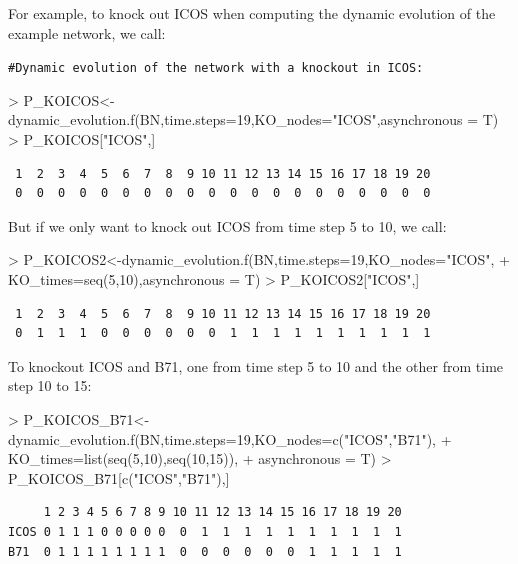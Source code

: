 \documentclass[a4paper]{article}
\begin{document}
For example, to knock out ICOS when computing the dynamic evolution of the example network, we call:
\begin{Schunk}
\end{Schunk}
\texttt{\#Dynamic evolution of the network with a knockout in ICOS:}
\begin{Schunk}
\begin{Sinput}
> P_KOICOS<-dynamic_evolution.f(BN,time.steps=19,KO_nodes="ICOS",asynchronous = T)
> P_KOICOS["ICOS",]
\end{Sinput}
\end{Schunk}
\begin{verbatim}
 1  2  3  4  5  6  7  8  9 10 11 12 13 14 15 16 17 18 19 20 
 0  0  0  0  0  0  0  0  0  0  0  0  0  0  0  0  0  0  0  0 
\end{verbatim}
But if we only want to knock out ICOS from time step 5 to 10, we call:
\begin{Schunk}
\begin{Sinput}
> P_KOICOS2<-dynamic_evolution.f(BN,time.steps=19,KO_nodes="ICOS",
+                                KO_times=seq(5,10),asynchronous = T)
> P_KOICOS2["ICOS",]
\end{Sinput}
\end{Schunk}
\begin{verbatim}
 1  2  3  4  5  6  7  8  9 10 11 12 13 14 15 16 17 18 19 20 
 0  1  1  1  0  0  0  0  0  0  1  1  1  1  1  1  1  1  1  1 
\end{verbatim}

To knockout ICOS and B71, one from time step 5 to 10 and the other from time step 10 to 15:
\begin{Schunk}
\begin{Sinput}
> P_KOICOS_B71<-dynamic_evolution.f(BN,time.steps=19,KO_nodes=c("ICOS","B71"), 
+                                   KO_times=list(seq(5,10),seq(10,15)),
+                                   asynchronous = T)
> P_KOICOS_B71[c("ICOS","B71"),]
\end{Sinput}
\end{Schunk}
\begin{verbatim}
     1 2 3 4 5 6 7 8 9 10 11 12 13 14 15 16 17 18 19 20
ICOS 0 1 1 1 0 0 0 0 0  0  1  1  1  1  1  1  1  1  1  1
B71  0 1 1 1 1 1 1 1 1  0  0  0  0  0  0  1  1  1  1  1
\end{verbatim}
\end{document}
